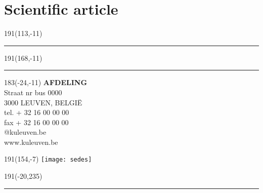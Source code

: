 \documentclass[12pt,a4paper,oneside]{book}
\begin{document}





\clearpage
{}
\appendix







\chapter{Scientific article}



\newpage
\thispagestyle{empty}
\sffamily
%
\begin{textblock}{191}(113,-11)
{\color{blueline}\rule{160pt}{5.5pt}}
\end{textblock}
%
\begin{textblock}{191}(168,-11)
{\color{blueline}\rule{5.5pt}{59pt}}
\end{textblock}
%
\begin{textblock}{183}(-24,-11)
\textblockcolour{}
\flushright
\fontsize{7}{7.5}\selectfont
\textbf{AFDELING}\\
Straat nr bus 0000\\
3000 LEUVEN, BELGI\"{E}\\
tel. + 32 16 00 00 00\\
fax + 32 16 00 00 00\\
@kuleuven.be\\
www.kuleuven.be\\
\end{textblock}
%
\begin{textblock}{191}(154,-7)
\textblockcolour{}
\texttt{[image: sedes]}
\end{textblock}
%
\begin{textblock}{191}(-20,235)
{\color{bluetitle}\rule{544pt}{55pt}}
\end{textblock}
\end{document}
